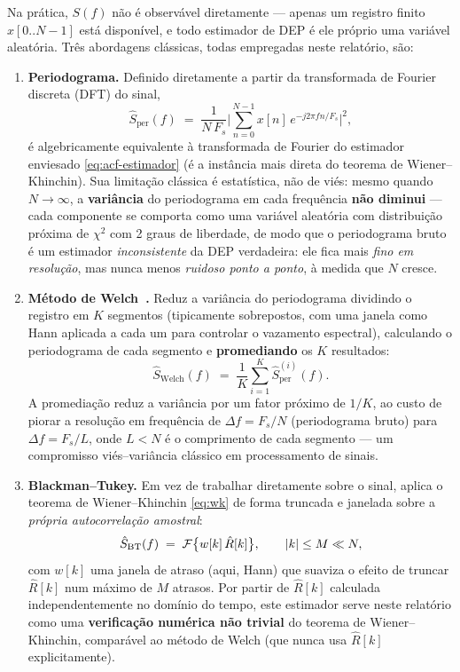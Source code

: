 Na prática, $S(f)$ não é observável diretamente --- apenas um registro finito $x[0..N-1]$ está
disponível, e todo estimador de DEP é ele próprio uma variável aleatória. Três abordagens
clássicas, todas empregadas neste relatório, são:

\begin{enumerate}[leftmargin=1.6em]
\item \textbf{Periodograma.} Definido diretamente a partir da transformada de Fourier discreta
      (DFT) do sinal,
      \begin{equation}
      \hat S_{\text{per}}(f) \;=\; \frac{1}{N\,F_s}\Big|\sum_{n=0}^{N-1} x[n]\,e^{-j2\pi f n/F_s}\Big|^2,
      \label{eq:periodograma}
      \end{equation}
      é algebricamente equivalente à transformada de Fourier do estimador enviesado
      \eqref{eq:acf-estimador} (é a instância mais direta do teorema de Wiener--Khinchin). Sua
      limitação clássica é estatística, não de viés: mesmo quando $N\to\infty$, a
      \textbf{variância} do periodograma em cada frequência \textbf{não diminui} --- cada
      componente se comporta como uma variável aleatória com distribuição próxima de
      $\chi^2$ com 2 graus de liberdade, de modo que o periodograma bruto é um estimador
      \emph{inconsistente} da DEP verdadeira: ele fica mais \emph{fino em resolução}, mas nunca
      menos \emph{ruidoso ponto a ponto}, à medida que $N$ cresce.
\item \textbf{Método de Welch~\cite{welch1967}.} Reduz a variância do periodograma dividindo o
      registro em $K$ segmentos (tipicamente sobrepostos, com uma janela como Hann aplicada a
      cada um para controlar o vazamento espectral), calculando o periodograma de cada segmento e
      \textbf{promediando} os $K$ resultados:
      \begin{equation}
      \hat S_{\text{Welch}}(f) \;=\; \frac{1}{K}\sum_{i=1}^{K} \hat S_{\text{per}}^{(i)}(f).
      \label{eq:welch}
      \end{equation}
      A promediação reduz a variância por um fator próximo de $1/K$, ao custo de piorar a
      resolução em frequência de $\Delta f = F_s/N$ (periodograma bruto) para
      $\Delta f = F_s/L$, onde $L<N$ é o comprimento de cada segmento --- um compromisso
      viés--variância clássico em processamento de sinais.
\item \textbf{Blackman--Tukey.} Em vez de trabalhar diretamente sobre o sinal, aplica o teorema
      de Wiener--Khinchin \eqref{eq:wk} de forma truncada e janelada sobre a \emph{própria
      autocorrelação amostral}:
      \begin{equation}
      \hat S_{\text{BT}}(f) \;=\; \mathcal{F}\big\{w[k]\,\hat R[k]\big\}, \qquad |k|\le M \ll N,
      \label{eq:bt}
      \end{equation}
      com $w[k]$ uma janela de atraso (aqui, Hann) que suaviza o efeito de truncar $\hat R[k]$
      num máximo de $M$ atrasos. Por partir de $\hat R[k]$ calculada independentemente no domínio
      do tempo, este estimador serve neste relatório como uma \textbf{verificação numérica
      não trivial} do teorema de Wiener--Khinchin, comparável ao método de Welch (que nunca usa
      $\hat R[k]$ explicitamente).
\end{enumerate}

